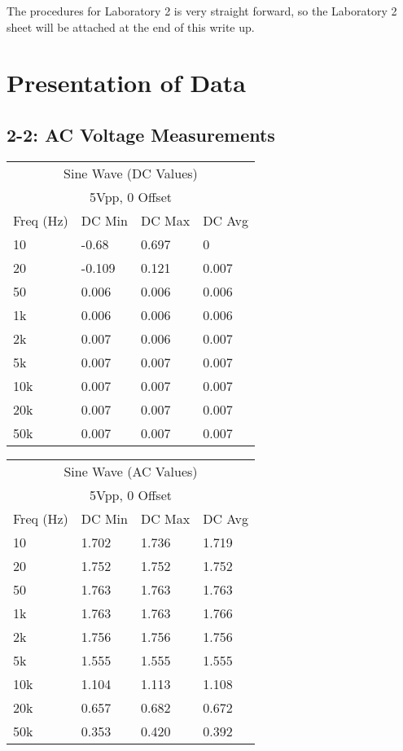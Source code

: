 \documentclass[%
 aip,
 jmp,
 amsmath,
 amssymb,
 reprint,%
 numerical,
 longbibliography,
]{revtex4-1}
\begin{document}
The procedures for Laboratory 2 is very straight forward, so the Laboratory 2 sheet will be attached at the end of this write up.

\section{Presentation of Data}

	\subsection{2-2: AC Voltage Measurements}
	
		\begin{tabularx}{0.45\textwidth}[t]{| X | X | X | X |}
		\hline
		\multicolumn{4}{|c|}{Sine Wave (DC Values)}\\
		\multicolumn{4}{|c|}{5Vpp, 0 Offset}\\		
		\hline
			\multicolumn{1}{|c|}{Freq (Hz)} & 
			\multicolumn{1}{c|}{DC Min} & 
			\multicolumn{1}{c|}{DC Max} &
			\multicolumn{1}{c|}{DC Avg} \\ 
		\hline
		10 & -0.68 & 0.697 & 0\\ \hline
		20 & -0.109 & 0.121 & 0.007\\ \hline
		50 & 0.006 & 0.006 & 0.006\\ \hline
		1k & 0.006 & 0.006 & 0.006\\ \hline
		2k & 0.007 & 0.006 & 0.007\\ \hline
		5k & 0.007 & 0.007 & 0.007\\ \hline
		10k & 0.007 & 0.007 & 0.007\\ \hline
		20k & 0.007 & 0.007 & 0.007\\ \hline
		50k & 0.007 & 0.007 & 0.007\\ \hline
		\end{tabularx}
	
		\begin{tabularx}{0.45\textwidth}[t]{| X | X | X | X |}
		\hline
		\multicolumn{4}{|c|}{Sine Wave (AC Values)}\\
		\multicolumn{4}{|c|}{5Vpp, 0 Offset}\\
		\hline
			\multicolumn{1}{|c|}{Freq (Hz)} & 
			\multicolumn{1}{c|}{DC Min} & 
			\multicolumn{1}{c|}{DC Max} &
			\multicolumn{1}{c|}{DC Avg} \\ 
		\hline
		10  & 1.702 & 1.736 & 1.719\\ \hline
		20  & 1.752 & 1.752 & 1.752\\ \hline
		50  & 1.763 & 1.763 & 1.763\\ \hline
		1k  & 1.763 & 1.763 & 1.766\\ \hline
		2k  & 1.756 & 1.756 & 1.756\\ \hline
		5k  & 1.555 & 1.555 & 1.555\\ \hline
		10k & 1.104 & 1.113 & 1.108\\ \hline
		20k & 0.657 & 0.682 & 0.672\\ \hline
		50k & 0.353 & 0.420 & 0.392\\ \hline
		\end{tabularx}
	
\end{document}
